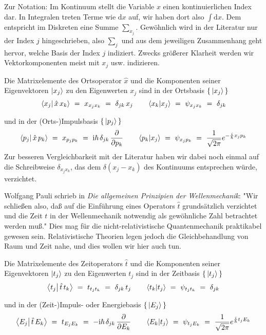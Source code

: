 \documentclass[12pt]{article}
\begin{document}
Zur Notation: Im Kontinuum stellt die Variable $x$ einen kontinuierlichen Index dar. In Integralen treten Terme wie $\mathrm{d}x$ auf, wir haben dort also $\int\mathrm{d}x$. Dem entspricht im Diskreten eine Summe $\sum_{x_j}$. Gewöhnlich wird in der Literatur nur der Index $j$ hingeschrieben, also $\sum_j$ und aus dem jeweiligen Zusammenhang geht hervor, welche Basis der Index $j$ indiziert. Zwecks größerer Klarheit werden wir Vektorkomponenten meist mit $x_j$ usw. indizieren.

Die Matrixelemente des Ortsoperator $\hat{x}$ und die Komponenten seiner Eigenvektoren $\ket{x_j}$ zu den Eigenwerten $x_j$ sind in der Ortsbasis $\{\,\ket{x_j}\,\}$
\begin{equation}
\bra{x_j}\ket{\,\hat{x}\,x_k}\ =\ x_{x_j x_k}\ =\ \delta_{jk}\,x_j
\quad\quad 
\bra{x_k}\ket{x_j}\ =\ \psi_{x_j x_k}\ =\ \delta_{jk}
\end{equation}

und in der (Orts-)Impulsbasis $\{\,\ket{p_j}\,\}$
\begin{equation}
\bra{p_j}\ket{\,\hat{x}\,p_k}\ =\ x_{p_j p_k}\ =\ 
\mathrm{i}\hbar\,\delta_{jk}\,\frac{\partial}{\partial p_k}
\quad\quad 
\bra{p_k}\ket{x_j}\ =\ \psi_{x_j p_k}\ =\ 
\frac{1}{\sqrt{2\pi}} e^{-\frac{i}{\hbar}x_j p_k}
\end{equation}
Zur besseren Vergleichbarkeit mit der Literatur haben wir dabei noch einmal auf die Schreibweise $\delta_{x_j x_k}$, das dem $\delta(x_j - x_k)$ des Kontinuums entsprechen würde, verzichtet.

Wolfgang Pauli schrieb in \emph{Die allgemeinen Prinzipien der Wellenmechanik}: "Wir schließen also, daß auf die Einführung eines Operators $\hat{t}$ grundsätzlich verzichtet und die Zeit $t$ in der Wellenmechanik notwendig als gewöhnliche Zahl betrachtet werden muß." Dies mag für die nicht-relativistische Quantenmechanik praktikabel gewesen sein. Relativistische Theorien legen jedoch die Gleichbehandlung von Raum und Zeit nahe, und dies wollen wir hier auch tun.

Die Matrixelemente des Zeitoperators $\hat{t}$ und die Komponenten seiner Eigenvektoren $\ket{t_j}$ zu den Eigenwerten $t_j$ sind in der Zeitbasis $\{\,\ket{t_j}\,\}$
\begin{equation}
\bra{t_j}\ket{\,\hat{t}\,t_k}\ =\ t_{t_j t_k}\ =\ \delta_{jk}\,t_j
\quad\quad 
\bra{t_k}\ket{t_j}\ =\ \psi_{t_j t_k}\ =\ \delta_{jk}
\end{equation}

und in der (Zeit-)Impuls- oder Energiebasis $\{\,\ket{E_j}\,\}$
\begin{equation}
\label{eq:time_components}
\bra{E_j}\ket{\,\hat{t}\,E_k}\ =\ t_{E_j E_k}\ =\ 
-\mathrm{i}\hbar\,\delta_{jk}\,\frac{\partial}{\partial E_k}
\quad\quad 
\bra{E_k}\ket{t_j}\ =\ \psi_{t_j E_k}\ =\ 
\frac{1}{\sqrt{2\pi}} e^{\frac{i}{\hbar}t_j E_k}
\end{equation}
\end{document}
